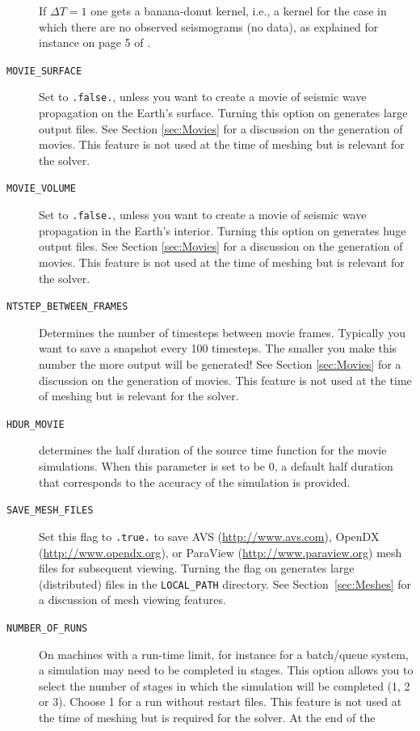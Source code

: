 \documentclass[oneside,english]{book}
\newcommand{\urlwithparentheses}[1]{(\url{#1})}
\begin{document}
\begin{description}
If $\Delta T=1$ one gets a banana-donut kernel, i.e., a kernel for the case in which there are no observed seismograms (no data), as explained for instance on page 5 of \cite{ZhLiTr11}.
%
\item [{\texttt{MOVIE\_SURFACE}}] Set to \texttt{.false.}, unless you want
to create a movie of seismic wave propagation on the Earth's surface.
Turning this option on generates large output files. See Section \ref{sec:Movies}
for a discussion on the generation of movies. This feature is not
used at the time of meshing but is relevant for the solver.
\item [{\texttt{MOVIE\_VOLUME}}] Set to \texttt{.false.}, unless you want
to create a movie of seismic wave propagation in the Earth's interior.
Turning this option on generates huge output files. See Section \ref{sec:Movies}
for a discussion on the generation of movies. This feature is not
used at the time of meshing but is relevant for the solver.
\item [{\texttt{NTSTEP\_BETWEEN\_FRAMES}}] Determines the number of timesteps
between movie frames. Typically you want to save a snapshot every
100 timesteps. The smaller you make this number the more output will
be generated! See Section \ref{sec:Movies} for a discussion on the
generation of movies. This feature is not used at the time of meshing
but is relevant for the solver.
\item [{\texttt{HDUR\_MOVIE}}] determines the half duration of the source
time function for the movie simulations. When this parameter is set
to be 0, a default half duration that corresponds to the accuracy
of the simulation is provided.
\item [{\texttt{SAVE\_MESH\_FILES}}] Set this flag to \texttt{.true}\texttt{\small .}
to save AVS \urlwithparentheses{http://www.avs.com}, OpenDX \urlwithparentheses{http://www.opendx.org}, or ParaView \urlwithparentheses{http://www.paraview.org}
mesh files for subsequent viewing. Turning the flag on generates large
(distributed) files in the \texttt{LOCAL\_PATH} directory. See Section~\ref{sec:Meshes}
for a discussion of mesh viewing features.
\item [{\texttt{NUMBER\_OF\_RUNS}}] On machines with a run-time limit,
for instance for a batch/queue system, a simulation may need to be
completed in stages. This option allows you to select the number of
stages in which the simulation will be completed (1, 2 or 3). Choose
1 for a run without restart files. This feature is not used at the
time of meshing but is required for the solver. At the end of the

\end{description}
\end{document}
